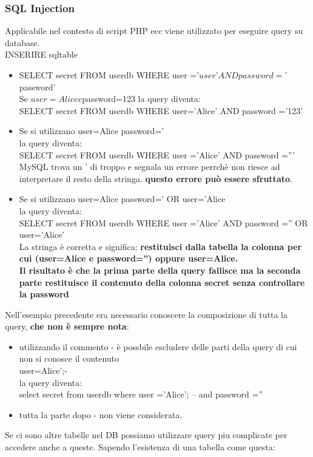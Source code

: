 \documentclass[12pt]{article}
\begin{document}
			\subsubsection{SQL Injection}
				Applicabile nel contesto di script PHP ecc viene utilizzato per eseguire query su database. \\
				
				INSERIRE sqltable \\
				
				\begin{itemize}
					\item SELECT secret FROM userdb WHERE user =’$user’ AND password =’$password’\\
					Se $user=Alice e $password=123 la query diventa:\\
					SELECT secret FROM userdb WHERE user=’Alice’ AND password =’123’
					\item Se si utilizzano
					user=Alice
					password=’\\
					la query diventa:\\
					SELECT secret FROM userdb WHERE user =’Alice’ AND password =”’\\
					MySQL trova un ' di troppo e segnala un errore perrchè non riesce ad interpretare il resto della stringa. \textbf{questo errore può essere sfruttato}.
					\item Se si utilizzano
					user=Alice
					password=’ OR user=’Alice\\
					la query diventa:\\ SELECT secret FROM userdb WHERE user =’Alice’
					AND password =” OR user=’Alice’\\
					La stringa è corretta e significa: \textbf{restituisci dalla tabella la colonna per cui
					(user=Alice e password=”) oppure user=Alice.\\
					Il risultato è che la prima parte della query fallisce ma la seconda parte
					restituisce il contenuto della colonna secret senza controllare la password}
				\end{itemize}
				Nell'esempio precedente era necessario conoscere la composizione di tutta la query, \textbf{che non è sempre nota}:
				\begin{itemize}
					\item utilizzando il commento - è possbile escludere delle parti della query di cui non si conosce il contenuto\\
					user=Alice';-\\
					la query diventa:\\
					select secret from userdb where user =’Alice’; – and password =”
					\item tutta la parte dopo - non viene considerata.
				\end{itemize}
				Se ci sono altre tabelle nel DB possiamo utilizzare query piu complicate per accedere anche a queste. Sapendo l'esistenza di una tabella come questa:\\
				
\end{document}
